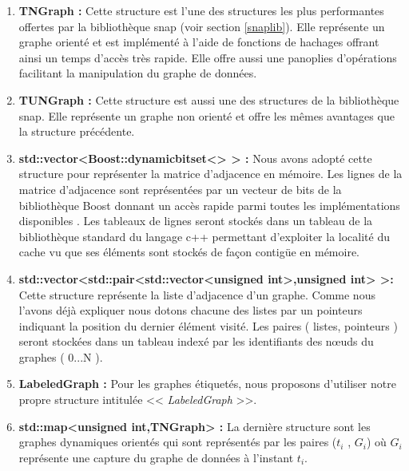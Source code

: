 \begin{enumerate}[label=(\alph*)]
\item \textbf{TNGraph :}
Cette structure est l'une des structures les plus performantes offertes par la bibliothèque 	 \gls{snap} (voir section \ref{snaplib}). Elle représente un graphe orienté et est implémenté à l'aide de fonctions de hachages offrant ainsi un temps d'accès très rapide. Elle offre aussi une panoplies d'opérations facilitant la manipulation du graphe de données.

\item\textbf{TUNGraph :}
Cette structure est aussi une des structures de la bibliothèque \gls{snap}. Elle représente un graphe non orienté et offre les mêmes avantages que la structure précédente. 

\item\textbf{std::vector<Boost::dynamicbitset<> > :}
 Nous avons adopté cette structure pour représenter la matrice d'adjacence en mémoire. Les lignes de la matrice d'adjacence sont représentées par un vecteur de bits de la bibliothèque Boost donnant un accès rapide parmi toutes les implémentations disponibles  \citep{pieterse2010performance}. Les tableaux de lignes seront stockés dans un tableau de la bibliothèque standard du langage c++ permettant d'exploiter la localité du cache vu que ses éléments sont stockés de façon contigüe en mémoire.
 
\item\textbf{std::vector<std::pair<std::vector<unsigned int>,unsigned int> >:}
Cette structure représente la liste d'adjacence d'un graphe. Comme nous l'avons déjà expliquer nous dotons chacune des listes par un pointeurs indiquant la position du dernier élément visité. Les paires ( listes, pointeurs ) seront stockées dans un tableau indexé par les identifiants des nœuds du graphes ( 0...N ).

\item\textbf{LabeledGraph :} Pour les graphes étiquetés, nous proposons d'utiliser notre propre structure intitulée << \textit{LabeledGraph} >>.

\item \textbf{std::map<unsigned int,TNGraph> :}
La dernière structure sont les graphes dynamiques orientés qui sont représentés par les paires ($t_i$ , $G_i$) où $G_i$ représente une capture du graphe de données à l'instant $t_i$.


\end{enumerate}



